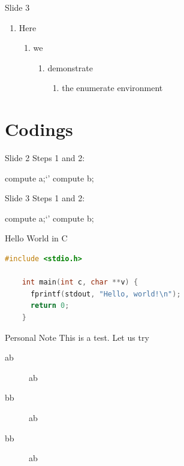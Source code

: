 \documentclass[
 size=12pt,
 paper=smartboard, %
 mode=present, %
 display=slides, %
style=tuliplab,
pauseslide,
fleqn,leqno]{powerdot}
\begin{document}
\begin{slide}{Slide 3}
  \begin{enumerate}[type=1]
    \item<1> Here
    \begin{enumerate}
      \item<2> we
      \begin{enumerate}
        \item<3> demonstrate
        \begin{enumerate}
          \item<4> the enumerate environment
        \end{enumerate}
      \end{enumerate}
    \end{enumerate}
  \end{enumerate}
\end{slide}


\section{Codings}

\begin{slide}[method=direct]{Slide 2}
Steps 1 and 2:
\begin{code}
compute a;`\pause'
compute b;
\end{code}
\end{slide}

\begin{slide}[method=file]{Slide 3}
Steps 1 and 2:
\begin{code}
compute a;`\pause'
compute b;
\end{code}
\end{slide}


\begin{slide}[method=direct]{Hello World in C}
  \begin{lstlisting}[language=c,gobble=4]
    #include <stdio.h>

    int main(int c, char **v) {
      fprintf(stdout, "Hello, world!\n");
      return 0;
    }
  \end{lstlisting}
\end{slide}
\begin{note}{Personal Note}
 This is a test. Let us try
\begin{description}
 \item[ab] ab 
 \item[bb] ab 
 \item[bb] ab 
\end{description}
\end{note}
\end{document}
